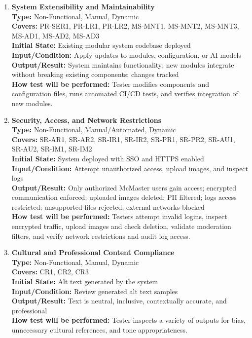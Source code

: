 \documentclass[12pt, titlepage]{article}
\begin{document}
\begin{enumerate}[label=NFR-ST \arabic*., wide=0pt, leftmargin=*]
  \item \textbf{System Extensibility and Maintainability} \\[2mm]
    \textbf{Type:} Non-Functional, Manual, Dynamic \\
    \textbf{Covers:} PR-SER1, PR-LR1, PR-LR2, MS-MNT1, MS-MNT2,
    MS-MNT3, MS-AD1, MS-AD2, MS-AD3 \\
    \textbf{Initial State:} Existing modular system codebase deployed \\
    \textbf{Input/Condition:} Apply updates to modules,
    configuration, or AI models \\
    \textbf{Output/Result:} System maintains functionality; new
    modules integrate without breaking existing components; changes
    tracked \\[2mm]
    \textbf{How test will be performed:} Tester modifies components
    and configuration files, runs automated CI/CD tests, and verifies
    integration of new modules.

  \item \textbf{Security, Access, and Network Restrictions} \\[2mm]
    \textbf{Type:} Non-Functional, Manual/Automated, Dynamic \\
    \textbf{Covers:} SR-AR1, SR-AR2, SR-IR1, SR-IR2, SR-PR1, SR-PR2,
    SR-AU1, SR-AU2, SR-IM1, SR-IM2 \\
    \textbf{Initial State:} System deployed with SSO and HTTPS enabled \\
    \textbf{Input/Condition:} Attempt unauthorized access, upload
    images, and inspect logs \\
    \textbf{Output/Result:} Only authorized McMaster users gain
    access; encrypted communication enforced; uploaded images
    deleted; PII filtered; logs access restricted; unsupported files
    rejected; external networks blocked \\[2mm]
    \textbf{How test will be performed:} Testers attempt invalid
    logins, inspect encrypted traffic, upload images and check
    deletion, validate moderation filters, and verify network
    restrictions and audit log access.

  \item \textbf{Cultural and Professional Content Compliance} \\[2mm]
    \textbf{Type:} Non-Functional, Manual, Dynamic \\
    \textbf{Covers:} CR1, CR2, CR3 \\
    \textbf{Initial State:} Alt text generated by the system \\
    \textbf{Input/Condition:} Review generated alt text samples \\
    \textbf{Output/Result:} Text is neutral, inclusive, contextually
    accurate, and professional \\[2mm]
    \textbf{How test will be performed:} Tester inspects a variety of
    outputs for bias, unnecessary cultural references, and tone appropriateness.


\end{enumerate}
\end{document}
